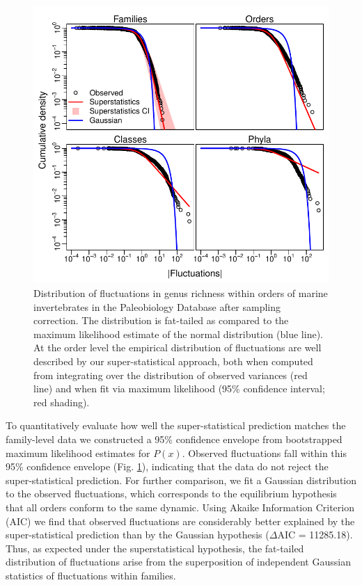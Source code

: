 \documentclass[12pt]{article}
\let\citep=\cite
\begin{document}
\begin{figure}[!h]
  \centering
  \includegraphics[scale=1]{../../fig_Px.pdf} 
  \caption[Order-level distribution of richness
  fluctuations]{Distribution of fluctuations in genus richness within
    orders of marine invertebrates in the Paleobiology Database
    \citep{alroy08} after sampling correction. The distribution is
    fat-tailed as compared to the maximum likelihood estimate of the
    normal distribution (blue line).  At the order level the empirical
    distribution of fluctuations are well described by our
    super-statistical approach, both when computed from integrating
    over the distribution of observed variances (red line) and when
    fit via maximum likelihood (95\% confidence interval; red
    shading).}
  \label{fig:Px}
\end{figure}

To quantitatively evaluate how well the super-statistical prediction
matches the family-level data we constructed a 95\% confidence
envelope from bootstrapped maximum likelihood estimates for
$P(x)$. Observed fluctuations fall within this 95\% confidence
envelope (Fig. \ref{fig:Px}), indicating that the data do not reject
the super-statistical prediction. For further comparison, we fit a
Gaussian distribution to the observed fluctuations, which corresponds
to the equilibrium hypothesis that all orders conform to the same
dynamic. Using Akaike Information Criterion (AIC) we find that
observed fluctuations are considerably better explained by the
super-statistical prediction than by the Gaussian hypothesis 
({\small $\Delta$}AIC = 11285.18). Thus, as expected under the
superstatistical hypothesis, the fat-tailed distribution of
fluctuations arise from the superposition of independent Gaussian
statistics of fluctuations within families.
\end{document}
